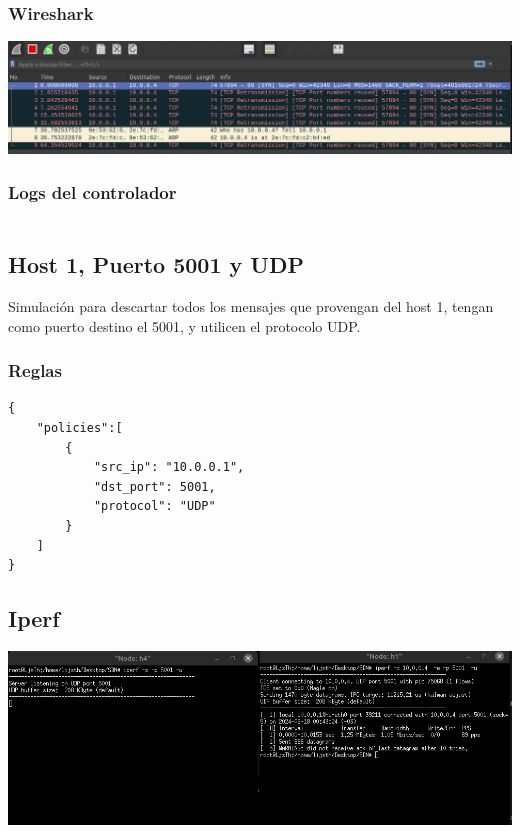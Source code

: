 \documentclass{article}
\begin{document}
\subsubsection{Wireshark}
\begin{center}
\includegraphics[scale=0.35]{bloq_80_port.png}
\end{center}

\subsubsection{Logs del controlador}
\begin{center}
  \inputminted[fontsize=\footnotesize]{text}{informe/logs/Port_80_Log.txt}
\end{center}

\subsection{Host 1, Puerto 5001 y UDP}
Simulación para descartar todos los mensajes que provengan del host 1, tengan como puerto destino el 5001, y utilicen el protocolo UDP.
\subsubsection{Reglas}
\begin{verbatim}
{
    "policies":[
        {
            "src_ip": "10.0.0.1",
            "dst_port": 5001,
            "protocol": "UDP"
        }
    ]
}
\end{verbatim}



\subsection{Iperf}
\begin{center}
\includegraphics[scale=0.35]{Multi_Rules_UDP_P80_h1_Iperf.png}
\end{center}
\end{document}
